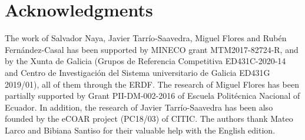 \section*{Acknowledgments}

The work of Salvador Naya, Javier Tarr\'io-Saavedra, Miguel Flores and Rub\'en Fern\'andez-Casal has been supported by MINECO grant MTM2017-82724-R,  and by the Xunta de Galicia (Grupos de Referencia Competitiva ED431C-2020-14 and Centro de Investigaci\'on del Sistema universitario de Galicia ED431G 2019/01), all of them through the ERDF. The research of Miguel Flores has been partially supported by Grant PII-DM-002-2016 of Escuela Polit\'ecnica Nacional of Ecuador. In addition, the research of Javier Tarr\'io-Saavedra has been also founded by the eCOAR project (PC18/03) of CITIC. The authors thank Mateo Larco and Bibiana Santiso for their valuable help with the English edition.



\address{Miguel Flores\\
  MODES, SIGTI, ADIAAC, Departamento de Matem\'aticas, Escuela Polit\'ecnica Nacional\\
  170517 Quito\\
  Ecuador\\
  0000-0002-7742-1247\\
  }

\address{Rub\'en Fern\'andez-Casal\\
  MODES, CITIC, Universidade da Coru\~{n}a\\
  Facultade de Inform\'atica, Campus de Elvi\~{n}a, A Coru\~{n}a\\
  Spain\\
  0000-0002-5785-3739\\
  }

\address{Salvador Naya\\
  MODES, CITIC, ITMATI, Universidade da Coru\~{n}a\\
  Escola Polit\'ecnica Superior, Mendiz\'abal s/n, Ferrol \\
  Spain\\
  0000-0003-4931-9859\\
  }
	
	\address{Javier Tarr\'io-Saavedra\\
  MODES, CITIC, Universidade da Coru\~{n}a\\
  Escola Polit\'ecnica Superior, Mendiz\'abal s/n, Ferrol \\
  Spain\\
  0000-0003-4931-9859\\
  }
